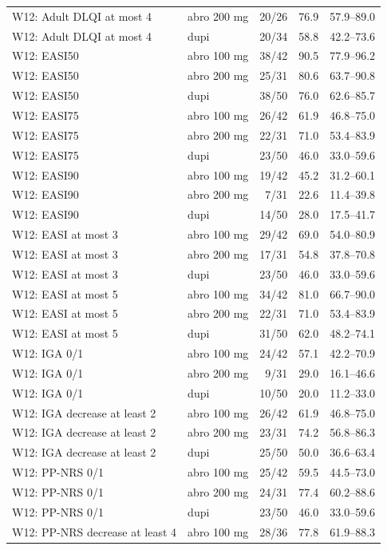 \begin{longtable}{llrrr}
W12: Adult DLQI at most 4 & abro 200 mg & 20/26 & 76.9 & 57.9--89.0 \\
W12: Adult DLQI at most 4 & dupi & 20/34 & 58.8 & 42.2--73.6 \\
W12: EASI50 & abro 100 mg & 38/42 & 90.5 & 77.9--96.2 \\
W12: EASI50 & abro 200 mg & 25/31 & 80.6 & 63.7--90.8 \\
W12: EASI50 & dupi & 38/50 & 76.0 & 62.6--85.7 \\
W12: EASI75 & abro 100 mg & 26/42 & 61.9 & 46.8--75.0 \\
W12: EASI75 & abro 200 mg & 22/31 & 71.0 & 53.4--83.9 \\
W12: EASI75 & dupi & 23/50 & 46.0 & 33.0--59.6 \\
W12: EASI90 & abro 100 mg & 19/42 & 45.2 & 31.2--60.1 \\
W12: EASI90 & abro 200 mg & 7/31 & 22.6 & 11.4--39.8 \\
W12: EASI90 & dupi & 14/50 & 28.0 & 17.5--41.7 \\
W12: EASI at most 3 & abro 100 mg & 29/42 & 69.0 & 54.0--80.9 \\
W12: EASI at most 3 & abro 200 mg & 17/31 & 54.8 & 37.8--70.8 \\
W12: EASI at most 3 & dupi & 23/50 & 46.0 & 33.0--59.6 \\
W12: EASI at most 5 & abro 100 mg & 34/42 & 81.0 & 66.7--90.0 \\
W12: EASI at most 5 & abro 200 mg & 22/31 & 71.0 & 53.4--83.9 \\
W12: EASI at most 5 & dupi & 31/50 & 62.0 & 48.2--74.1 \\
W12: IGA 0/1 & abro 100 mg & 24/42 & 57.1 & 42.2--70.9 \\
W12: IGA 0/1 & abro 200 mg & 9/31 & 29.0 & 16.1--46.6 \\
W12: IGA 0/1 & dupi & 10/50 & 20.0 & 11.2--33.0 \\
W12: IGA decrease at least 2 & abro 100 mg & 26/42 & 61.9 & 46.8--75.0 \\
W12: IGA decrease at least 2 & abro 200 mg & 23/31 & 74.2 & 56.8--86.3 \\
W12: IGA decrease at least 2 & dupi & 25/50 & 50.0 & 36.6--63.4 \\
W12: PP-NRS 0/1 & abro 100 mg & 25/42 & 59.5 & 44.5--73.0 \\
W12: PP-NRS 0/1 & abro 200 mg & 24/31 & 77.4 & 60.2--88.6 \\
W12: PP-NRS 0/1 & dupi & 23/50 & 46.0 & 33.0--59.6 \\
W12: PP-NRS decrease at least 4 & abro 100 mg & 28/36 & 77.8 & 61.9--88.3 \\

\end{longtable}
